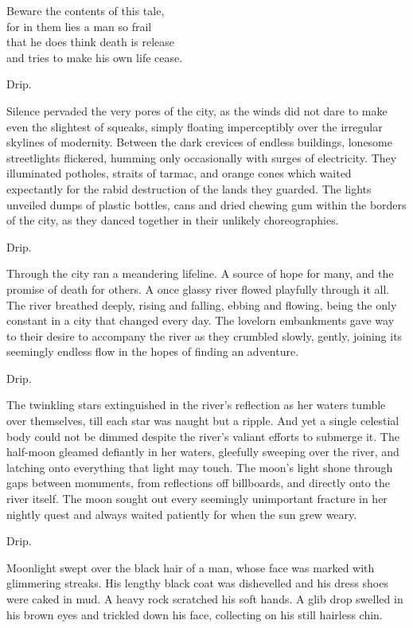 \begin{center}\small{
Beware the contents of this tale,\\
for in them lies a man so frail\\
that he does think death is release\\
and tries to make his own life cease.}
\end{center}
Drip.

Silence pervaded the very pores of the city, as the winds did not dare to make even the slightest of squeaks, simply floating imperceptibly over the irregular skylines of modernity. Between the dark crevices of endless buildings, lonesome streetlights flickered, humming only occasionally with surges of electricity. They illuminated potholes, straits of tarmac, and orange cones which waited expectantly for the rabid destruction of the lands they guarded.  The lights unveiled dumps of plastic bottles, cans and dried chewing gum within the borders of the city, as they danced together in their unlikely choreographies.

Drip.

Through the city ran a meandering lifeline. A source of hope for many, and the promise of death for others. A once glassy river flowed playfully through it all. The river breathed deeply, rising and falling, ebbing and flowing, being the only constant in a city that changed every day. The lovelorn embankments gave way to their desire to accompany the river as they crumbled slowly, gently, joining its seemingly endless flow in the hopes of finding an adventure.

Drip.

The twinkling stars extinguished in the river’s reflection as her waters tumble over themselves, till each star was naught but a ripple. And yet a single celestial body could not be dimmed despite the river’s valiant efforts to submerge it. The half-moon gleamed defiantly in her waters, gleefully sweeping over the river, and latching onto everything that light may touch. The moon’s light shone through gaps between monuments, from reflections off billboards, and directly onto the river itself. The moon sought out every seemingly unimportant fracture in her nightly quest and always waited patiently for when the sun grew weary.

Drip.

Moonlight swept over the black hair of a man, whose face was marked with glimmering streaks. His lengthy black coat was dishevelled and his dress shoes were caked in mud. A heavy rock scratched his soft hands. A glib drop swelled in his brown eyes and trickled down his face, collecting on his still hairless chin.

